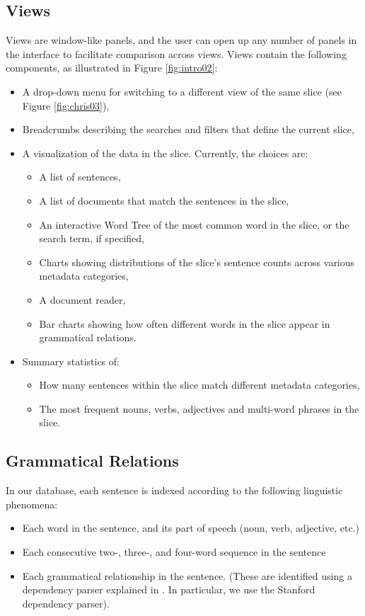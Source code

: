 \documentclass{sig-alternate}
\begin{document}
\subsection{Views}
Views  are window-like panels, and the user can open up any number of panels in the interface to facilitate comparison across views.  Views contain the following components, as illustrated in Figure \ref{fig:intro02}:
\begin{itemize}
	\item A drop-down menu for switching to a different view of the same slice (see Figure \ref{fig:chris03}),
	\item Breadcrumbs describing the searches and filters that define the current slice,
	\item A visualization of the data in the slice. Currently, the choices are:
		\begin{itemize}
			\item A list of sentences,
			\item A list of documents that match the sentences in the slice,
			\item An interactive Word Tree \cite{wattenberg_word_2008} of the most common word in the slice, or the search term, if specified,
			\item Charts showing distributions of the slice's sentence counts across various metadata categories,
			\item A document reader,
			\item Bar charts showing how often different words in the slice  appear in grammatical relations.
		\end{itemize}
	\item Summary statistics of:
		\begin{itemize}
			\item How many sentences within the slice match different metadata categories,
			\item The most frequent nouns, verbs, adjectives and multi-word phrases in the slice.
		\end{itemize}
\end{itemize}

\subsection{Grammatical Relations}


 In our database, each sentence is indexed according to the following linguistic phenomena:
\begin{itemize}
  \item Each word in the sentence, and its part of speech (noun, verb, adjective, etc.)
  \item Each consecutive two-, three-, and four-word sequence in the sentence
  \item Each grammatical relationship in the sentence. (These are identified using a dependency parser  explained in \cite{jurafsky_chapter_2009}. In particular, we use the Stanford dependency parser\cite{klein_accurate_2003}).
\end{itemize}
\end{document}
